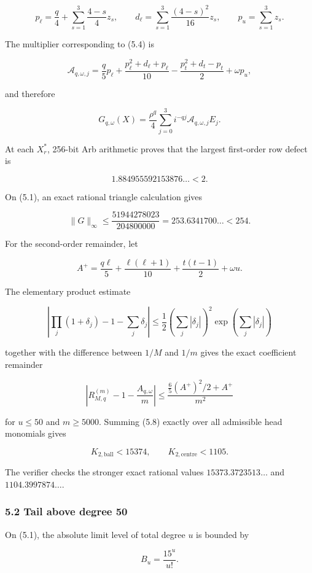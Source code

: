 \documentclass[
  11pt,
  a4paper,
]{article}
\begin{document}
\[
p_\ell=\frac q4+\sum_{s=1}^3\frac{4-s}{4}z_s,
\qquad
d_\ell=\sum_{s=1}^3\frac{(4-s)^2}{16}z_s,
\qquad
p_u=\sum_{s=1}^3z_s.
\]

The multiplier corresponding to (5.4) is

\[
\mathcal A_{q,\omega,j}=
\frac q5p_\ell+
\frac{p_\ell^2+d_\ell+p_\ell}{10}
-\frac{p_t^2+d_t-p_t}{2}+\omega p_u,
\tag{5.4a}
\]

and therefore

\[
G_{q,\omega}(X)=\frac{\rho^q}{4}
\sum_{j=0}^3i^{-qj}\mathcal A_{q,\omega,j}E_j.
\tag{5.4b}
\]

At each \(X_r^*\), 256-bit Arb arithmetic proves that the largest
first-order row defect is

\[
1.884955592153876\ldots<2.
\tag{5.5}
\]

On (5.1), an exact rational triangle calculation gives

\[
\|G\|_\infty\le
\frac{51944278023}{204800000}
=253.6341700\ldots<254.
\tag{5.6}
\]

For the second-order remainder, let

\[
A^+=\frac{q\ell}{5}+\frac{\ell(\ell+1)}{10}
+\frac{t(t-1)}2+\omega u.
\]

The elementary product estimate

\[
\left|\prod_j(1+\delta_j)-1-\sum_j\delta_j\right|
\le\frac12\left(\sum_j|\delta_j|\right)^2
\exp\!\left(\sum_j|\delta_j|\right)
\tag{5.7}
\]

together with the difference between \(1/M\) and \(1/m\) gives the exact
coefficient remainder

\[
\left|R^{(m)}_{M,q}-1-\frac{A_{q,\omega}}m\right|
\le \frac{\frac65(A^+)^2/2+A^+}{m^2}
\tag{5.8}
\]

for \(u\le50\) and \(m\ge5000\). Summing (5.8) exactly over all
admissible head monomials gives

\[
K_{2,\mathrm{ball}}<15374,
\qquad
K_{2,\mathrm{centre}}<1105.
\tag{5.9}
\]

The verifier checks the stronger exact rational values
\(15373.3723513\ldots\) and \(1104.3997874\ldots\).

\subsubsection{5.2 Tail above degree 50}\label{tail-above-degree-50}

On (5.1), the absolute limit level of total degree \(u\) is bounded by

\[
B_u=\frac{15^u}{u!}.
\tag{5.10}
\]
\end{document}
